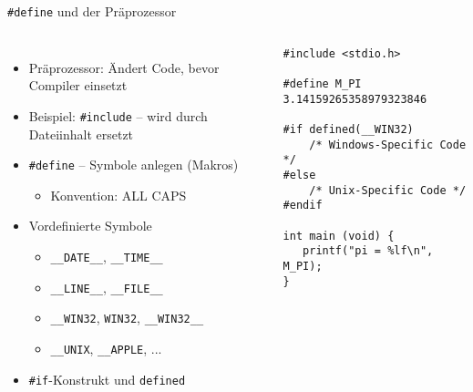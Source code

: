\begin{frame}[fragile]{\texttt{\#define} und der Präprozessor}
%
\begin{columns}[T]
\begin{itemize}
\item Präprozessor: Ändert Code, bevor Compiler einsetzt
\item Beispiel: \texttt{#include} -- wird durch Dateiinhalt ersetzt
\item \texttt{#define} -- Symbole anlegen (Makros)
	\begin{itemize}
	\item Konvention: ALL CAPS
	\end{itemize}
\item Vordefinierte Symbole
	\begin{itemize}
	\item \texttt{\_\_DATE\_\_}, \texttt{\_\_TIME\_\_}
	\item \texttt{\_\_LINE\_\_}, \texttt{\_\_FILE\_\_}
	\item \texttt{\_\_WIN32}, \texttt{WIN32}, \texttt{\_\_WIN32\_\_}
	\item \texttt{\_\_UNIX}, \texttt{\_\_APPLE}, ...
	\end{itemize}
\item \texttt{#if}-Konstrukt und \texttt{defined} 
\end{itemize}
%
\begin{codebox}
\begin{verbatim}
#include <stdio.h>

#define M_PI 3.14159265358979323846

#if defined(__WIN32)
    /* Windows-Specific Code */
#else
    /* Unix-Specific Code */
#endif

int main (void) {
   printf("pi = %lf\n", M_PI);
}
\end{verbatim}
\end{codebox}
\end{columns}
%
\end{frame}


